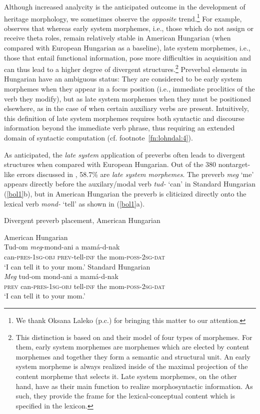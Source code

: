 \documentclass[output=paper,colorlinks,citecolor=brown,footheight=42pt]{langscibook}
\begin{document}
Although increased analycity is the anticipated outcome in the development of heritage morphology, we sometimes observe the \textit{opposite} trend.\footnote{We thank Oksana Laleko (p.c.) for bringing this matter to our attention.} For example, \citet{bol2000} observes that whereas early system morphemes, i.e., those which do not assign or receive theta roles, remain relatively stable in American Hungarian (when compared with European Hungarian as a baseline), late system morphemes, i.e., those that entail functional information, pose more difficulties in acquisition and can thus lead to a higher degree of divergent structures.\footnote{This distinction is based on \citet{myersscottonjake2000} and their model of four types of morphemes. For them, early system morphemes are morphemes which are elected by content morphemes and together they form a semantic and structural unit. An early system morpheme is always realized inside of the maximal projection of the content morpheme that selects it. Late system morphemes, on the other hand, have as their main function to realize morphosyntactic information. As such, they provide the frame for the lexical-conceptual content which is specified in the lexicon.} Preverbal elements in Hungarian have an ambiguous status: They are considered to be early system morphemes when they appear in a focus position (i.e., immediate proclitics of the verb they modify), but as late system morphemes when they must be positioned elsewhere, as in the case of when certain auxiliary verbs are present. Intuitively, this definition of late system morphemes requires both syntactic and discourse information beyond the immediate verb phrase, thus requiring an extended domain of syntactic computation (cf. footnote~\ref{fn:lohndal:4}).

As anticipated, the \textit{late system} application of preverbs often leads to divergent structures when compared with European Hungarian. Out of the 380 nontarget-like errors discussed in \citet[225]{bol2000}, 58.7\% are \textit{late system morphemes}. The preverb \textit{meg} `me' appears directly before the auxilary/modal verb \textit{tud-} `can' in Standard Hungarian (\ref{bol1}b), but in American Hungarian the preverb is cliticized directly onto the lexical verb \textit{mond-} `tell' as shown in (\ref{bol1}a). 

\begin{exe}
\ex Divergent preverb placement, American Hungarian \citep[96]{bol2000} \label{bol1}
\begin{xlist}
 \ex American Hungarian\\
     \gll Tud-om \emph{meg}-mond-ani a mamá-d-nak \\
          can-\textsc{pres-1sg-obj} \textsc{prev}-tell-\textsc{inf} the mom-\textsc{poss-2sg-dat} \\
          \glt `I can tell it to your mom.'
\ex Standard Hungarian\\
    \gll \emph{Meg} tud-om mond-ani a mamá-d-nak \\
         \textsc{prev} can-\textsc{pres-1sg-obj} tell-\textsc{inf} the mom-\textsc{poss-2sg-dat} \\
        \glt `I can tell it to your mom.'
\end{xlist}
\end{exe}
\end{document}
